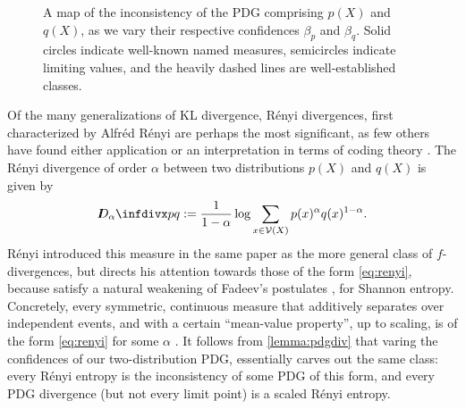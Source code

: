 \documentclass[twoside]{article}
\makeatletter
\theoremstyle{plain}
\theoremstyle{definition}
\newcommand{\thickD}{I\mkern-8muD}
\newcommand{\V}{\mathcal V}
\newcommand\aar{\@ifstar\aar@one@star\aar@plain}
\newcommand\aar@one@star{\@ifstar\aar@resize{\aar@plain*}}
\newcommand\aar@resize[1]{\sbox{\aar@content}{#1}\scaleleftright[3.8ex]
		{\Biggl\langle\!\!\!\!\Biggl\langle}{\usebox{\aar@content}}
		{\Biggr\rangle\!\!\!\!\Biggr\rangle}}
\makeatother
\begin{document}
\begin{figure*}
\begin{tikzpicture}[xscale=1.8, yscale=1.4]
	\end{tikzpicture}
	\caption{A map of the inconsistency of the PDG comprising $p(X)$ and $q(X)$, as we vary their respective confidences $\beta_p$ and $\beta_q$. Solid circles indicate well-known named measures, semicircles indicate limiting values, and the heavily dashed lines are well-established classes. }
	\label{fig:statdistmap}
\end{figure*}




Of the many generalizations of KL divergence, R\'enyi divergences, first characterized by Alfr\'ed R\'enyi \cite{renyi1961measures} are perhaps the most significant, as few others have found either application or an interpretation in terms of coding theory \cite{van2014renyi}.
The R\'enyi divergence of order $\alpha$ between two distributions $p(X)$ and $q(X)$ is given by
\begin{equation}
	\thickD_\alpha\infdivx p q := \frac{1}{1- \alpha} \log \sum_{x \in \V(X)} p(x)^\alpha q(x)^{1-\alpha}.  \label{eq:renyi}
\end{equation}
R\'enyi introduced this measure in the same paper as the more general class of $f$-divergences, but directs his attention towards those of the form \eqref{eq:renyi}, because satisfy a natural weakening of Fadeev's postulates \cite{fadeev1957begriff}, for Shannon entropy.
Concretely, every symmetric, continuous measure that additively separates over independent events, and with a certain ``mean-value property'', up to scaling, 
is of the form \eqref{eq:renyi} for some $\alpha$ \cite{renyi1961measures}.
It follows from \cref{lemma:pdgdiv} that varing the confidences of our two-distribution PDG, essentially carves out the same class: every R\'enyi entropy is the inconsistency of some PDG of this form, and every PDG divergence (but not every limit point) is a scaled R\'enyi entropy.
\end{document}
